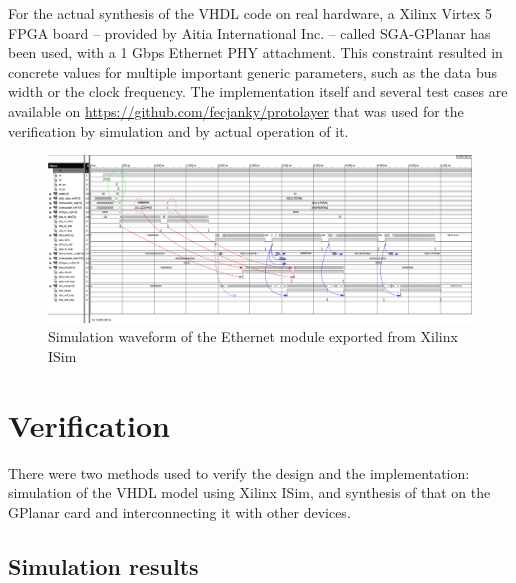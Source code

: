 \documentclass[journal]{IEEEtran}
\begin{document}
For the actual synthesis of the VHDL code on real hardware, a Xilinx Virtex 5 FPGA board -- provided by Aitia
International Inc. -- called SGA-GPlanar \cite{GPlanar} has been used, with a 1 Gbps Ethernet PHY attachment. This
constraint resulted in concrete values for multiple important generic parameters, such as the data bus width or the
clock frequency.
The implementation itself and several test cases are available on \cite{GIT_protolayer}
\url{https://github.com/fecjanky/protolayer} that was used for the verification by simulation and by actual operation
of it.

\begin{figure}[!htb]
    \centering
    \includegraphics[width=1\textwidth]{figures_raw/ether_tst_wave_annotated.png}
    \caption{Simulation waveform of the Ethernet module exported from Xilinx ISim}
    \label{fig:eth_sim}
\end{figure}

\section{Verification}\label{sec:Verification}

There were two methods used to verify the design and the implementation:
simulation of the VHDL model using Xilinx ISim, and
synthesis of that on the GPlanar card and interconnecting it with other
devices.

\subsection{Simulation results}
\end{document}
